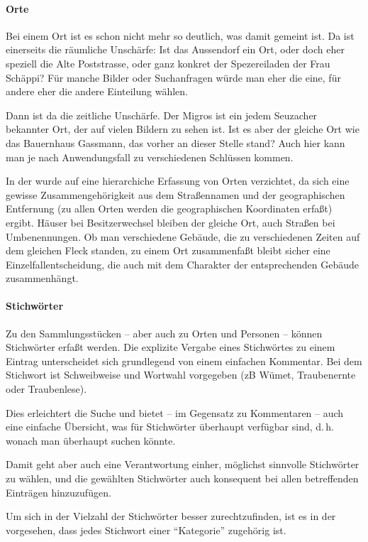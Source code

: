 \documentclass{scrartcl}
\begin{document}
\paragraph{Orte} Bei einem Ort ist es schon nicht mehr so deutlich, was damit gemeint ist.
Da ist einerseits die räumliche Unschärfe: Ist das Aussendorf ein Ort, oder doch
eher speziell die Alte Poststrasse, oder ganz konkret der Spezereiladen der Frau Schäppi?
Für manche Bilder oder Suchanfragen würde man eher die eine, für andere eher die andere
Einteilung wählen. 

Dann ist da die zeitliche Unschärfe. Der Migros ist ein jedem Seuzacher bekannter
Ort, der auf vielen Bildern zu sehen ist. Ist es aber der gleiche Ort wie das
Bauernhaus Gassmann, das vorher an dieser Stelle stand? Auch hier kann man je nach
Anwendungsfall zu verschiedenen Schlüssen kommen.

In der \DB{} wurde auf eine hierarchiche Erfassung von Orten
verzichtet, da sich eine gewisse Zusammengehörigkeit aus dem
Straßennamen und der geographischen Entfernung (zu allen Orten werden
die geographischen Koordinaten erfaßt) ergibt. Häuser bei
Besitzerwechsel bleiben der gleiche Ort, auch Straßen bei
Umbenennungen. Ob man verschiedene Gebäude, die zu verschiedenen Zeiten
auf dem gleichen Fleck standen, zu einem Ort zusammenfaßt bleibt sicher
eine Einzelfallentscheidung, die auch mit dem Charakter der entsprechenden
Gebäude zusammenhängt.

\paragraph{Stichwörter} Zu den Sammlungsstücken -- aber auch zu Orten und Personen --
können Stichwörter erfaßt werden. Die explizite Vergabe eines
Stichwörtes zu einem Eintrag unterscheidet sich grundlegend von einem
einfachen Kommentar. Bei dem Stichwort ist Schweibweise und Wortwahl
vorgegeben (zB Wümet, Traubenernte oder Traubenlese).

Dies erleichtert die Suche und bietet -- im Gegensatz zu Kommentaren
-- auch eine einfache Übersicht, was für Stichwörter überhaupt
verfügbar sind, d.\,h.  wonach man überhaupt suchen könnte.

Damit geht aber auch eine Verantwortung einher, möglichst sinnvolle
Stichwörter zu wählen, und die gewählten Stichwörter auch konsequent
bei allen betreffenden Einträgen hinzuzufügen.

Um sich in der Vielzahl der Stichwörter besser zurechtzufinden, ist es
in der \DB{} vorgesehen, dass jedes Stichwort einer ``Kategorie''
zugehörig ist.
\end{document}
